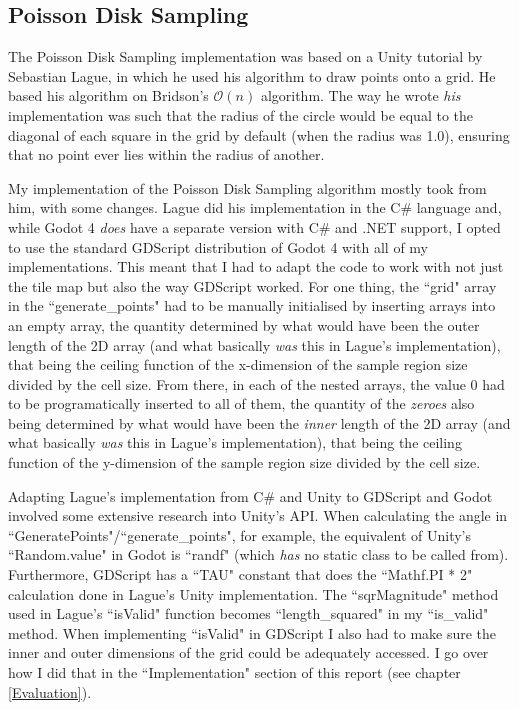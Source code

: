 \subsection{Poisson Disk Sampling}

The Poisson Disk Sampling implementation was based on a Unity tutorial by Sebastian Lague\cite{seblaguetuteYT}\cite{seblaguetuteGH}, in which he used his algorithm to draw points onto a grid. He based his algorithm on Bridson's $\mathcal{O}(n)$ algorithm.\cite{10.1145/1278780.1278807} The way he wrote \textit{his} implementation was such that the radius of the circle would be equal to the diagonal of each square in the grid by default (when the radius was 1.0), ensuring that no point ever lies within the radius of another.

My implementation of the Poisson Disk Sampling algorithm mostly took from him, with some changes. Lague did his implementation in the C\# language and, while Godot 4 \textit{does} have a separate version with C\# and .NET support, I opted to use the standard GDScript distribution of Godot 4 with all of my implementations. This meant that I had to adapt the code to work with not just the tile map but also the way GDScript worked. For one thing, the ``grid" array in the ``generate\_points" had to be manually initialised by inserting arrays into an empty array, the quantity determined by what would have been the outer length of the 2D array (and what basically \textit{was} this in Lague's implementation), that being the ceiling function of the x-dimension of the sample region size divided by the cell size. From there, in each of the nested arrays, the value 0 had to be programatically inserted to all of them, the quantity of the \textit{zeroes} also being determined by what would have been the \textit{inner} length of the 2D array (and what basically \textit{was} this in Lague's implementation), that being the ceiling function of the y-dimension of the sample region size divided by the cell size.

Adapting Lague's implementation from C\# and Unity to GDScript and Godot involved some extensive research into Unity's API. When calculating the angle in ``GeneratePoints"/``generate\_points", for example, the equivalent of Unity's ``Random.value" in Godot is ``randf" (which \textit{has} no static class to be called from). Furthermore, GDScript has a ``TAU" constant that does the ``Mathf.PI * 2" calculation done in Lague's Unity implementation. The ``sqrMagnitude" method used in Lague's ``isValid" function becomes ``length\_squared" in my ``is\_valid" method. When implementing ``isValid" in GDScript I also had to make sure the inner and outer dimensions of the grid could be adequately accessed. I go over how I did that in the ``Implementation" section of this report (see chapter \ref{Evaluation}).

